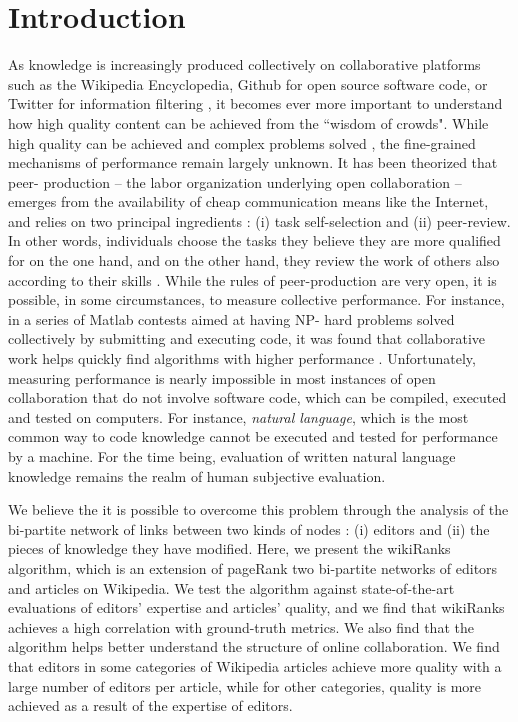 \section{Introduction}
As knowledge is increasingly produced collectively on collaborative platforms 
such as the Wikipedia Encyclopedia, Github for open source software code, or 
Twitter for information filtering \cite{}, it becomes ever more important to 
understand how high quality content can be achieved from the ``wisdom of 
crowds". While  high quality can be achieved \cite{giles2005internet} and 
complex problems solved \cite{cooper2010}, the fine-grained mechanisms of 
performance remain largely unknown. It has been theorized that peer-
production -- the labor organization underlying open collaboration -- emerges 
from the availability of cheap communication means like the Internet, and relies 
on two principal ingredients : (i) task self-selection and (ii) peer-review. In other 
words, individuals choose the tasks they believe they are more qualified for on 
the one hand, and on the other hand, they review the work of others also 
according to their skills \cite{benkler2002}. While the rules of peer-production 
are very open, it is possible, in some circumstances, to measure collective 
performance. For instance, in a series of Matlab contests aimed at having NP-
hard problems solved collectively by submitting and executing code, it was 
found that collaborative work helps quickly find algorithms with higher 
performance \cite{gulley2010}. Unfortunately, measuring performance is 
nearly impossible in most instances of open collaboration that do not involve 
software code, which can be compiled, executed and tested on computers. For 
instance, {\it natural language}, which is the most common way to code 
knowledge cannot be executed and tested for performance by a machine. For 
the time being, evaluation of written natural language knowledge remains the 
realm of human subjective evaluation.

We believe the it is possible to overcome this problem through the analysis of the bi-partite network of links between two kinds of nodes : (i) editors and (ii) the pieces of knowledge they have modified. Here, we present the wikiRanks algorithm, which is an extension of pageRank two bi-partite networks of editors and articles on Wikipedia. We test the algorithm against state-of-the-art  evaluations of editors' expertise and articles' quality, and we find that wikiRanks  achieves a high correlation with ground-truth metrics. We also find that the algorithm helps better understand the structure of online collaboration. We find that editors in some categories of Wikipedia articles achieve more quality with a large number of editors per article, while for other categories, quality is more achieved as a result of the expertise of editors.

